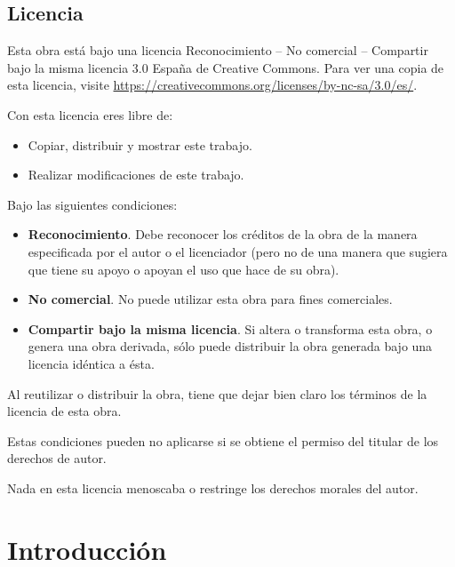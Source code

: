 \documentclass[
  a4paper,
]{scrreport}
\providecommand{\tightlist}{%
  \setlength{\itemsep}{0pt}\setlength{\parskip}{0pt}}\usepackage{longtable,booktabs,array}
\theoremstyle{definition}
\theoremstyle{remark}
\begin{document}
\section*{Licencia}\label{licencia}


Esta obra está bajo una licencia Reconocimiento -- No comercial --
Compartir bajo la misma licencia 3.0 España de Creative Commons. Para
ver una copia de esta licencia, visite
\url{https://creativecommons.org/licenses/by-nc-sa/3.0/es/}.

Con esta licencia eres libre de:

\begin{itemize}
\tightlist
\item
  Copiar, distribuir y mostrar este trabajo.
\item
  Realizar modificaciones de este trabajo.
\end{itemize}

Bajo las siguientes condiciones:

\begin{itemize}
\item
  \textbf{Reconocimiento}. Debe reconocer los créditos de la obra de la
  manera especificada por el autor o el licenciador (pero no de una
  manera que sugiera que tiene su apoyo o apoyan el uso que hace de su
  obra).
\item
  \textbf{No comercial}. No puede utilizar esta obra para fines
  comerciales.
\item
  \textbf{Compartir bajo la misma licencia}. Si altera o transforma esta
  obra, o genera una obra derivada, sólo puede distribuir la obra
  generada bajo una licencia idéntica a ésta.
\end{itemize}

Al reutilizar o distribuir la obra, tiene que dejar bien claro los
términos de la licencia de esta obra.

Estas condiciones pueden no aplicarse si se obtiene el permiso del
titular de los derechos de autor.

Nada en esta licencia menoscaba o restringe los derechos morales del
autor.


\chapter{Introducción}\label{introducciuxf3n}
\end{document}
